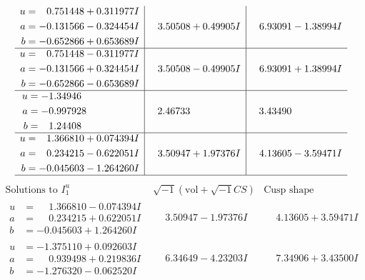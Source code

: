 \documentclass[1p]{elsarticle_modified}
\theoremstyle{definition}
\newcommand{\I}{\sqrt{-1}}
\begin{document}
$$\begin{array}{c|c|c}
\begin{aligned}
u &= \phantom{-}0.751448 + 0.311977 I \\
a &= -0.131566 - 0.324454 I \\
b &= -0.652866 + 0.653689 I\end{aligned}
 & \phantom{-}3.50508 + 0.49905 I & \phantom{-}6.93091 - 1.38994 I \\ \hline\begin{aligned}
u &= \phantom{-}0.751448 - 0.311977 I \\
a &= -0.131566 + 0.324454 I \\
b &= -0.652866 - 0.653689 I\end{aligned}
 & \phantom{-}3.50508 - 0.49905 I & \phantom{-}6.93091 + 1.38994 I \\ \hline\begin{aligned}
u &= -1.34946\phantom{ +0.000000I} \\
a &= -0.997928\phantom{ +0.000000I} \\
b &= \phantom{-}1.24408\phantom{ +0.000000I}\end{aligned}
 & \phantom{-}2.46733\phantom{ +0.000000I} & \phantom{-}3.43490\phantom{ +0.000000I} \\ \hline\begin{aligned}
u &= \phantom{-}1.366810 + 0.074394 I \\
a &= \phantom{-}0.234215 - 0.622051 I \\
b &= -0.045603 - 1.264260 I\end{aligned}
 & \phantom{-}3.50947 + 1.97376 I & \phantom{-}4.13605 - 3.59471 I\\
 \hline 
 \end{array}$$\newpage$$\begin{array}{c|c|c}  
\text{Solutions to }I^u_{1}& \I (\text{vol} + \sqrt{-1}CS) & \text{Cusp shape}\\
 \hline 
\begin{aligned}
u &= \phantom{-}1.366810 - 0.074394 I \\
a &= \phantom{-}0.234215 + 0.622051 I \\
b &= -0.045603 + 1.264260 I\end{aligned}
 & \phantom{-}3.50947 - 1.97376 I & \phantom{-}4.13605 + 3.59471 I \\ \hline\begin{aligned}
u &= -1.375110 + 0.092603 I \\
a &= \phantom{-}0.939498 + 0.219836 I \\
b &= -1.276320 - 0.062520 I\end{aligned}
 & \phantom{-}6.34649 - 4.23203 I & \phantom{-}7.34906 + 3.43500 I \\ \hline\begin{aligned}

\end{aligned}
\end{array}$$
\end{document}
